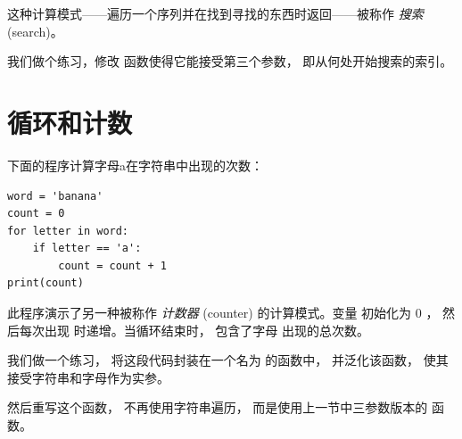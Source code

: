 这种计算模式——遍历一个序列并在找到寻找的东西时返回——被称作 {\em 搜索} (search)。


我们做个练习，修改  函数使得它能接受第三个参数， 即从何处开始搜索的索引。

\section{循环和计数}
\label{counter}
  
  


下面的程序计算字母a在字符串中出现的次数：

\begin{lstlisting}
word = 'banana'
count = 0
for letter in word:
    if letter == 'a':
        count = count + 1
print(count)
\end{lstlisting}

%

此程序演示了另一种被称作 {\em 计数器} (counter) 的计算模式。变量  初始化为 0 ， 然后每次出现  时递增。当循环结束时， 包含了字母  出现的总次数。


我们做一个练习， 将这段代码封装在一个名为  的函数中， 并泛化该函数， 使其接受字符串和字母作为实参。


然后重写这个函数， 不再使用字符串遍历， 而是使用上一节中三参数版本的  函数。

